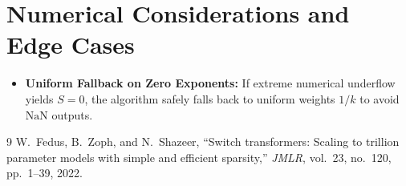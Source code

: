 \documentclass[11pt,a4paper]{article}
\theoremstyle{definition}
\begin{document}
\section{Numerical Considerations and Edge Cases}
\begin{itemize}
    \item \textbf{Uniform Fallback on Zero Exponents:} If extreme numerical underflow yields $S = 0$, the algorithm safely falls back to uniform weights $1/k$ to avoid $\text{NaN}$ outputs.
\end{itemize}

\begin{thebibliography}{9}
 W.~Fedus, B.~Zoph, and N.~Shazeer, ``Switch transformers: Scaling to trillion parameter models with simple and efficient sparsity,'' \emph{JMLR}, vol.~23, no.~120, pp.~1--39, 2022.
\end{thebibliography}
\end{document}
